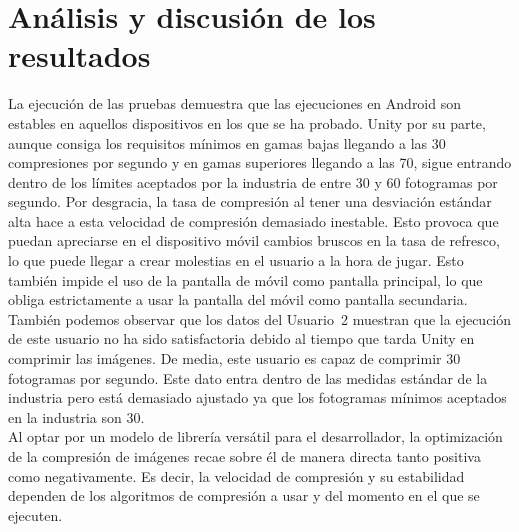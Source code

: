 \section{An\'alisis y discusi\'on de los resultados}
La ejecuci\'on de las pruebas demuestra que las ejecuciones en Android son estables en aquellos dispositivos en los que se ha probado. Unity por su parte, aunque consiga los requisitos m\'inimos en gamas bajas llegando a las 30 compresiones por segundo y en gamas superiores llegando a las 70, sigue entrando  dentro de los l\'imites aceptados por la industria de entre 30 y 60 fotogramas por segundo. Por desgracia, la tasa de compresi\'on al tener una desviaci\'on est\'andar alta hace a esta velocidad de compresi\'on demasiado inestable. Esto provoca que puedan apreciarse en el dispositivo m\'ovil cambios bruscos en la tasa de refresco, lo que puede llegar a crear molestias en el usuario a la hora de jugar. Esto tambi\'en impide el uso de la pantalla de m\'ovil como pantalla principal, lo que obliga estrictamente a usar la pantalla del m\'ovil como pantalla secundaria.\\

Tambi\'en podemos observar que los datos del Usuario~2 muestran que la ejecuci\'on de este usuario no ha sido satisfactoria debido al tiempo que tarda Unity en comprimir las im\'agenes. De media, este usuario es capaz de comprimir 30 fotogramas por segundo. Este dato entra dentro de las medidas est\'andar de la industria pero est\'a demasiado ajustado ya que los fotogramas m\'inimos aceptados en la industria son 30.\\

Al optar por un modelo de librer\'ia vers\'atil para el desarrollador, la optimizaci\'on de la compresi\'on de im\'agenes recae sobre \'el de manera directa tanto positiva como negativamente. Es decir, la velocidad de compresi\'on y su estabilidad dependen de los algoritmos de compresi\'on a usar y del momento en el que se ejecuten.\\



